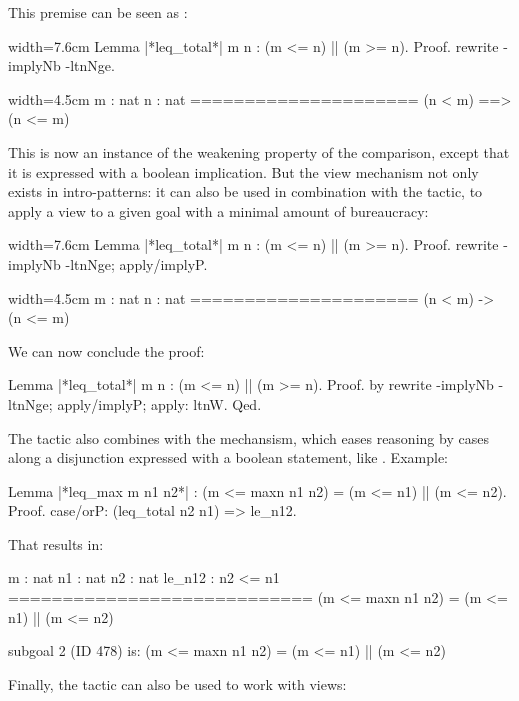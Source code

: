 This premise can be seen as :

\begin{coq}{}{width=7.6cm}
Lemma |*leq_total*| m n : (m <= n) || (m >= n).
Proof.
rewrite -implyNb -ltnNge.
\end{coq}
\begin{coqout}{}{width=4.5cm}
m : nat
n : nat
=====================
(n < m) ==> (n <= m)
\end{coqout}

This is now an instance of the weakening property of the comparison,
except that it is expressed with a boolean implication. But the view
mechanism not only exists in intro-patterns: it can also be used in
combination with the  tactic, to apply a view to a given goal
with a minimal amount of bureaucracy:

\begin{coq}{}{width=7.6cm}
Lemma |*leq_total*| m n : (m <= n) || (m >= n).
Proof.
rewrite -implyNb -ltnNge; apply/implyP.
\end{coq}
\begin{coqout}{}{width=4.5cm}
m : nat
n : nat
=====================
(n < m) -> (n <= m)
\end{coqout}

We can now conclude the proof:

\begin{coq}{}{}
Lemma |*leq_total*| m n : (m <= n) || (m >= n).
Proof. by rewrite -implyNb -ltnNge; apply/implyP; apply: ltnW. Qed.
\end{coq}

The  tactic also combines with the  mechansism, which
eases reasoning by cases along a disjunction expressed with a boolean
statement, like . Example:

\begin{coq}{}{}
Lemma |*leq_max m n1 n2*| :
  (m <= maxn n1 n2) = (m <= n1) || (m <= n2).
Proof.
case/orP: (leq_total n2 n1) => le_n12.
\end{coq}

That results in:

\begin{coqout}{}{}
m : nat
n1 : nat
n2 : nat
le_n12 : n2 <= n1
============================
(m <= maxn n1 n2) = (m <= n1) || (m <= n2)

subgoal 2 (ID 478) is:
 (m <= maxn n1 n2) = (m <= n1) || (m <= n2)
\end{coqout}

Finally, the  tactic can also be used to work with views:

